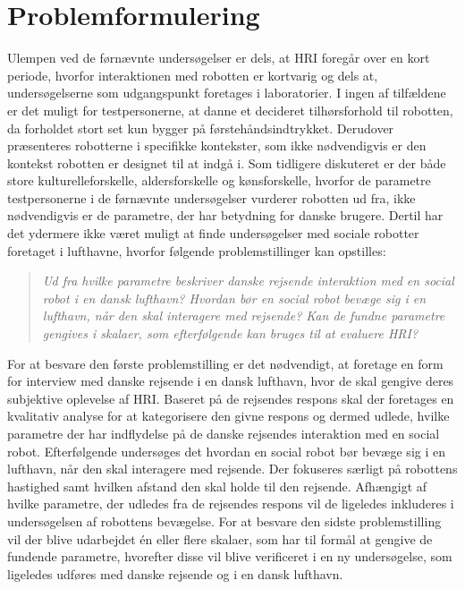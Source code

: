 \section{Problemformulering}
\label{Problemformulering}
%
Ulempen ved de førnævnte undersøgelser er dels, at HRI foregår over en kort periode, hvorfor interaktionen med robotten er kortvarig og dels at, undersøgelserne som udgangspunkt foretages i laboratorier. I ingen af tilfældene er det muligt for testpersonerne, at danne et decideret tilhørsforhold til robotten, da forholdet stort set kun bygger på førstehåndsindtrykket. Derudover præsenteres robotterne i specifikke kontekster, som ikke nødvendigvis er den kontekst robotten er designet til at indgå i. Som tidligere diskuteret er der både store kulturelleforskelle, aldersforskelle og kønsforskelle, hvorfor de parametre testpersonerne i de førnævnte undersøgelser vurderer robotten ud fra, ikke nødvendigvis er de parametre, der har betydning for danske brugere. Dertil har det ydermere ikke været muligt at finde undersøgelser med sociale robotter foretaget i lufthavne, hvorfor følgende problemstillinger kan opstilles:\blankline
%
\begin{quotation}
	\noindent
	\textit{Ud fra hvilke parametre beskriver danske rejsende interaktion med en social robot i en dansk lufthavn?\blankline
		Hvordan bør en social robot bevæge sig i en lufthavn, når den skal interagere med rejsende?\blankline
		Kan de fundne parametre gengives i skalaer, som efterfølgende kan bruges til at evaluere HRI?}\blankline
\end{quotation}
%
For at besvare den første problemstilling er det nødvendigt, at foretage en form for interview med danske rejsende i en dansk lufthavn, hvor de skal gengive deres subjektive oplevelse af HRI. Baseret på de rejsendes respons skal der foretages en kvalitativ analyse for at kategorisere den givne respons og dermed udlede, hvilke parametre der har indflydelse på de danske rejsendes interaktion med en social robot. Efterfølgende undersøges det hvordan en social robot bør bevæge sig i en lufthavn, når den skal interagere med rejsende. Der fokuseres særligt på robottens hastighed samt hvilken afstand den skal holde til den rejsende. Afhængigt af hvilke parametre, der udledes fra de rejsendes respons vil de ligeledes inkluderes i undersøgelsen af robottens bevægelse. For at besvare den sidste problemstilling vil der blive udarbejdet én eller flere skalaer, som har til formål at gengive de fundende parametre, hvorefter disse vil blive verificeret i en ny undersøgelse, som ligeledes udføres med danske rejsende og i en dansk lufthavn.




